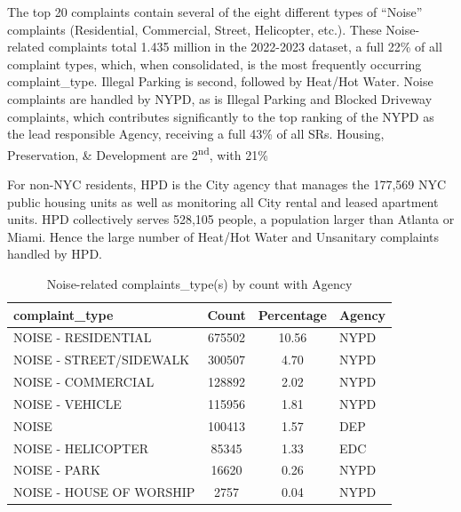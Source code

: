 \documentclass[12pt, titlepage]{article}
\begin{document}
The top 20 complaints contain several of the eight different types of ``Noise'' 
complaints (Residential, Commercial, Street, Helicopter, etc.). These Noise-related
complaints total 1.435 million in the 2022-2023 dataset, a full 22\% of 
all complaint types, which, when consolidated, is the most frequently occurring complaint\_type.
Illegal Parking is second, followed by Heat/Hot Water. Noise complaints 
are handled by NYPD, as is Illegal Parking and Blocked Driveway complaints, 
which contributes significantly to the top ranking of the NYPD as the lead 
responsible Agency, receiving a full 43\% of all SRs. 
Housing, Preservation, \& Development are 2\textsuperscript{nd}, with 21\%

For  non-NYC residents, HPD is the City agency that manages the 
177,569 NYC public housing units as well as monitoring
all City rental and leased apartment units. HPD collectively serves 
528,105 people, a population larger than Atlanta or Miami. 
Hence the large number of Heat/Hot Water and Unsanitary complaints 
handled by HPD. 



\begin{table}[tbp]
    \centering
    \normalsize
    \caption{Noise-related complaints\_type(s) by count with Agency}
    \begin{tabular}{@{}lS[table-format=7.0,round-mode=places,
    round-precision=0]S[table-format=2.2,round-mode=places,
    round-precision=2]l@{}} %
        \toprule
        \textbf{complaint\_type} & \textbf{Count} & \textbf{Percentage} & \textbf{Agency} \\ 
        \midrule
        NOISE - RESIDENTIAL        & 675502 & 10.56 & NYPD  \\ 
        NOISE - STREET/SIDEWALK    & 300507 &  4.70 & NYPD  \\ 
        NOISE - COMMERCIAL         & 128892 &  2.02 & NYPD  \\ 
        NOISE - VEHICLE            & 115956 &  1.81 & NYPD  \\ 
        NOISE                      & 100413 &  1.57 & DEP   \\ 
        NOISE - HELICOPTER         &  85345 &  1.33 & EDC   \\ 
        NOISE - PARK               &  16620 &  0.26 & NYPD  \\ 
        NOISE - HOUSE OF WORSHIP   &   2757 &  0.04 & NYPD  \\ 
        \bottomrule
    \end{tabular}
    \label{tab:noisecomplaints}
\end{table}
\end{document}
